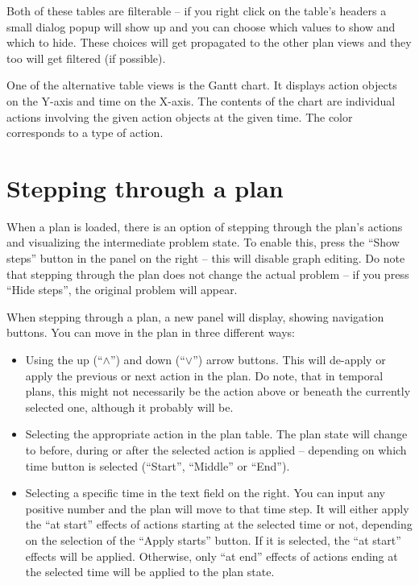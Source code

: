 \documentclass[12pt,a4paper,twoside]{article}
\begin{document}
Both of these tables are filterable -- if you right click on the table's headers a small dialog popup will show up
and you can choose which values to show and which to hide. These choices will get propagated to the other plan views
and they too will get filtered (if possible).

One of the alternative table views is the Gantt chart. It displays action objects on the Y-axis and time on the X-axis.
The contents of the chart are individual actions involving the given action objects at the given time. The color
corresponds to a type of action.

\section{Stepping through a plan}
When a plan is loaded, there is an option of stepping through the plan's actions and visualizing the intermediate
problem state. To enable this, press the ``Show steps'' button in the panel on the right -- this will disable graph editing.
Do note that stepping through the plan does not change the
actual problem -- if you press ``Hide steps'', the original problem will appear.

When stepping through a plan, a new panel will display, showing navigation buttons.
You can move in the plan in three different ways:

\begin{itemize}

\item Using the up (``$\wedge$'') and down (``$\vee$'') arrow buttons. This will de-apply or apply the previous
or next action in the plan. Do note, that in temporal plans, this might not necessarily be the action
above or beneath the currently selected one, although it probably will be.

\item Selecting the appropriate action in the plan table. The plan state will change to before, during or after the
selected action is applied -- depending on which time button is selected (``Start'', ``Middle'' or ``End'').

\item Selecting a specific time in the text field on the right. You can input any positive number and the plan will move to
that time step. It will either apply the ``at start'' effects of actions starting at the selected time or not, depending
on the selection of the ``Apply starts'' button. If it is selected, the ``at start'' effects will be applied.
Otherwise, only ``at end'' effects of actions ending at the selected time will be applied to the plan state.

\end{itemize}


\end{document}
